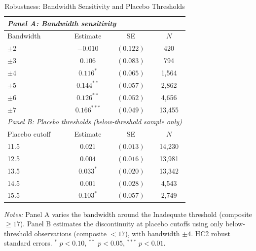 \begin{table}[t]
\centering
\begin{threeparttable}
\caption{Robustness: Bandwidth Sensitivity and Placebo Thresholds}
\label{tab:robust}
\begin{tabular}{lccc}
\toprule
\multicolumn{4}{l}{\textit{Panel A: Bandwidth sensitivity}} \\
\midrule
Bandwidth & Estimate & SE & $N$ \\
\midrule
$\pm 2$ & $-0.010$ & $(0.122)$ & 420 \\
$\pm 3$ & $0.106$ & $(0.083)$ & 794 \\
$\pm 4$ & $0.116^{*}$ & $(0.065)$ & 1,564 \\
$\pm 5$ & $0.144^{**}$ & $(0.057)$ & 2,862 \\
$\pm 6$ & $0.126^{**}$ & $(0.052)$ & 4,656 \\
$\pm 7$ & $0.166^{***}$ & $(0.049)$ & 13,455 \\
\midrule
\multicolumn{4}{l}{\textit{Panel B: Placebo thresholds (below-threshold sample only)}} \\
\midrule
Placebo cutoff & Estimate & SE & $N$ \\
\midrule
11.5 & $0.021$ & $(0.013)$ & 14,230 \\
12.5 & $0.004$ & $(0.016)$ & 13,981 \\
13.5 & $0.033^{*}$ & $(0.020)$ & 13,342 \\
14.5 & $0.001$ & $(0.028)$ & 4,543 \\
15.5 & $0.103^{*}$ & $(0.057)$ & 2,749 \\
\bottomrule
\end{tabular}
\begin{tablenotes}[flushleft]
\small
\item \textit{Notes:} Panel A varies the bandwidth around the Inadequate threshold (composite $\geq 17$). Panel B estimates the discontinuity at placebo cutoffs using only below-threshold observations (composite $< 17$), with bandwidth $\pm 4$. HC2 robust standard errors. $^{*}$ $p<0.10$, $^{**}$ $p<0.05$, $^{***}$ $p<0.01$.
\end{tablenotes}
\end{threeparttable}
\end{table}
